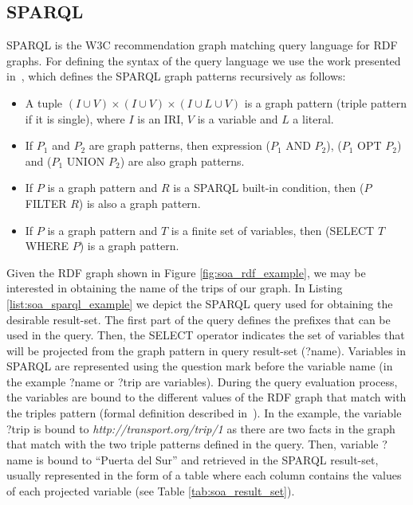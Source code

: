 \subsection{SPARQL}
SPARQL is the W3C recommendation graph matching query language for RDF graphs. For defining the syntax of the query language we use the work presented in~\citep{perez2009semantics}, which defines the SPARQL graph patterns recursively as follows:
\begin{itemize}
    \item A tuple $(I \cup V) \times (I \cup V) \times (I \cup L \cup V)$ is a graph pattern (triple pattern if it is single), where $I$ is an IRI, $V$ is a variable and $L$ a literal.
    \item If $P_1$ and $P_2$ are graph patterns, then expression ($P_1$ AND $P_2$), ($P_1$ OPT $P_2$) and ($P_1$ UNION $P_2$) are also graph patterns.
    \item If $P$ is a graph pattern and $R$ is a SPARQL built-in condition, then ($P$ FILTER $R$) is also a graph pattern.
    \item If $P$ is a graph pattern and $T$ is a finite set of variables, then (SELECT $T$ WHERE $P$) is a graph pattern.
\end{itemize}

Given the RDF graph shown in Figure \ref{fig:soa_rdf_example}, we may be interested in obtaining the name of the trips of our graph. In Listing \ref{list:soa_sparql_example} we depict the SPARQL query used for obtaining the desirable result-set. The first part of the query defines the prefixes that can be used in the query. Then, the SELECT operator indicates the set of variables that will be projected from the graph pattern in query result-set (?name). Variables in SPARQL are represented using the question mark before the variable name (in the example ?name or ?trip are variables). During the query evaluation process, the variables are bound to the different values of the RDF graph that match with the triples pattern (formal definition described in~\citep{perez2009semantics}). In the example, the variable ?trip is bound to \textit{http://transport.org/trip/1 } as there are two facts in the graph that match with the two triple patterns defined in the query. Then, variable ?name is bound to ``Puerta del Sur'' and retrieved in the SPARQL result-set, usually represented in the form of a table where each column contains the values of each projected variable (see Table \ref{tab:soa_result_set}).





